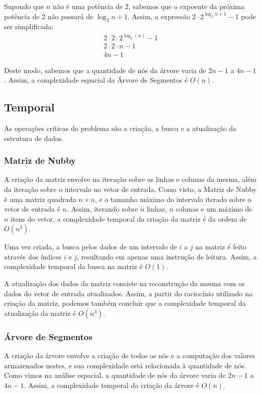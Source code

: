 \documentclass{article}
\begin{document}
Supondo que $n$ não é uma potência de 2, sabemos que o expoente da próxima potência de 2 não passará de ${\log_2 n} + 1$. Assim, a expressão $2 \cdot 2^{\log_2 n + 1} - 1$ pode ser simplificada:
\begin{gather*}
  2 \cdot 2 \cdot 2^{\log_2(n)} - 1 \\
  2 \cdot 2 \cdot n - 1 \\
  4n - 1
\end{gather*}

Deste modo, sabemos que a quantidade de nós da árvore varia de $2n - 1$ a $4n - 1$. Assim, a complexidade espacial da Árvore de Segmentos é $O(n)$.

\subsection{Temporal}
As operações críticas do problema são a criação, a busca e a atualização da estrutura de dados.

\subsubsection{Matriz de Nubby}

A criação da matriz envolve na iteração sobre as linhas e colunas da mesma, além da iteração sobre o intervalo no vetor de entrada. Como visto, a Matriz de Nubby é uma matriz quadrada $n \times n$, e o tamanho máximo do intervalo iterado sobre o vetor de entrada é $n$. Assim, iterando sobre $n$ linhas, $n$ colunas e um máximo de $n$ itens do vetor, a complexidade temporal da criação da matriz é da ordem de $O(n^3)$.

Uma vez criada, a busca pelos dados de um intervalo de $i$ a $j$ na matriz é feito através dos índices $i$ e $j$, resultando em apenas uma instrução de leitura. Assim, a complexidade temporal da busca na matriz é $O(1)$.

A atualização dos dados da matriz consiste na reconstrução da mesma com os dados do vetor de entrada atualizados. Assim, a partir do raciocínio utilizado na criação da matriz, podemos também concluir que a complexidade temporal da atualização da matriz é $O(n^3)$.

\subsubsection{Árvore de Segmentos}

A criação da árvore envolve a criação de todos os nós e a computação dos valores armazenados nestes, e sua complexidade está relacionada à quantidade de nós. Como vimos na análise espacial, a quantidade de nós da árvore varia de $2n - 1$ a $4n - 1$. Assim, a complexidade temporal da criação da árvore é $O(n)$.
\end{document}
